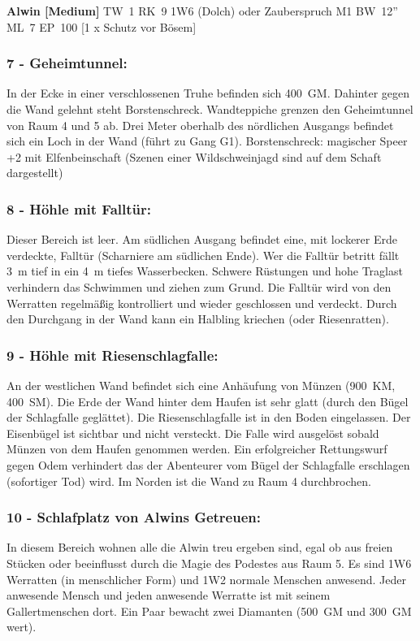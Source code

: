 \textbf{Alwin [Medium]} TW~1 RK~9
1W6 (Dolch) oder Zauberspruch M1 BW~12'' ML~7 EP~100 [1 x Schutz vor Bösem]
 

\subsubsection{7 - Geheimtunnel:} In der Ecke in einer verschlossenen Truhe befinden sich
400~GM. Dahinter gegen die Wand gelehnt steht Borstenschreck. Wandteppiche
grenzen den Geheimtunnel von Raum 4 und 5 ab. Drei Meter oberhalb des nördlichen
Ausgangs befindet sich ein Loch in der Wand (führt zu Gang G1).
Borstenschreck: magischer Speer +2 mit Elfenbeinschaft (Szenen einer
Wildschweinjagd sind auf dem Schaft dargestellt)

\subsubsection{8 - Höhle mit Falltür:} Dieser Bereich ist leer. Am südlichen Ausgang
befindet eine, mit lockerer Erde verdeckte, Falltür (Scharniere am
südlichen Ende). Wer die Falltür betritt fällt 3~m tief in ein 4~m
tiefes Wasserbecken. Schwere Rüstungen und hohe Traglast verhindern das
Schwimmen und ziehen zum Grund.  Die Falltür wird von den Werratten
regelmäßig kontrolliert und wieder geschlossen und verdeckt. Durch
den Durchgang in der Wand kann ein Halbling kriechen (oder Riesenratten).

\subsubsection{9 - Höhle mit Riesenschlagfalle:} An der westlichen Wand befindet sich
eine Anhäufung von Münzen (900~KM, 400~SM). Die Erde der Wand hinter dem
Haufen ist sehr glatt (durch den Bügel der Schlagfalle geglättet). Die
Riesenschlagfalle ist in den Boden eingelassen. Der Eisenbügel ist
sichtbar und nicht versteckt. Die Falle wird ausgelöst sobald Münzen
von dem Haufen genommen werden. Ein erfolgreicher Rettungswurf gegen
Odem verhindert das der Abenteurer vom Bügel der Schlagfalle erschlagen
(sofortiger Tod) wird. Im Norden ist die Wand zu Raum 4 durchbrochen.

\subsubsection{10 - Schlafplatz von Alwins Getreuen:} In diesem Bereich wohnen alle die
Alwin treu ergeben sind, egal ob aus freien Stücken oder beeinflusst
durch die Magie des Podestes aus Raum 5. Es sind 1W6 Werratten (in
menschlicher Form) und 1W2 normale Menschen anwesend. Jeder anwesende
Mensch und jeden anwesende Werratte ist mit seinem Gallertmenschen dort.
Ein Paar bewacht zwei Diamanten (500~GM und 300~GM wert).


